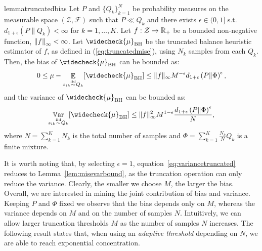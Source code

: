 \documentclass{article}
\begin{document}
\begin{restatable}{lemma}{truncatedbias}\label{lem:truncatedbias}
	Let $P$ and $\{ Q_k \}_{k=1}^N$ be probability measures on the measurable space $(\mathcal{Z},\mathcal{F})$ such that $P\ll Q_k$ and there exists $\epsilon \in (0,1]$ s.t. $d_{1+\epsilon}(P\|Q_k)<\infty$ for $k=1,\dots,K$. Let $f:\mathcal{Z}\to\Reals_{+}$ be a bounded non-negative function, \ie $\norm[\infty]{f}<\infty$. Let $\widecheck{\mu}_{\text{BH}}$ be the truncated balance heuristic estimator of $f$, as defined in (\ref{eq:truncatedmise}), using $N_k$ \iid samples from each $Q_k$. Then, the bias of $\widecheck{\mu}_{\text{BH}}$ can be bounded as:
	 \begin{equation}
	 \label{eq:biastruncated}
         0 \le \mu - \Exp_{z_{ik} \simiid Q_k} [\widecheck{\mu}_{\text{BH}}] \le  \|f\|_{\infty} M^{-\epsilon} d_{1+\epsilon}\left( P \| \Phi \right)^{\epsilon},
    \end{equation}
    and the variance of $\widecheck{\mu}_{\text{BH}}$ can be bounded as:
    \begin{equation}
    \label{eq:variancetruncated}
         \Var_{z_{ik} \simiid Q_k} [\widecheck{\mu}_{\text{BH}}] \le  \|f\|_{\infty}^2 M^{1-\epsilon} \frac{d_{1+\epsilon}\left( P \| \Phi \right)^{\epsilon}}{N},
    \end{equation}
	where ${N=\sum_{k=1}^{K}N_k}$ is the total number of samples and ${\Phi=\sum_{k=1}^K\frac{N_k}{N}Q_k}$ is a finite mixture.
\end{restatable}
%
It is worth noting that, by selecting $\epsilon=1$, equation~\eqref{eq:variancetruncated} reduces to Lemma~\ref{lem:misevarbound}, as the truncation operation can only reduce the variance. Clearly, the smaller we choose $M$, the larger the bias. Overall, we are interested in mining the joint contribution of bias and variance. Keeping $P$ and $\Phi$ fixed we observe that the bias depends only on $M$, whereas the variance depends on $M$ and on the number of samples $N$. Intuitively, we can allow larger truncation thresholds $M$ as the number of samples $N$ increases. The following result states that, when using an \textit{adaptive threshold} depending on $N$, we are able to reach exponential concentration.
\end{document}
